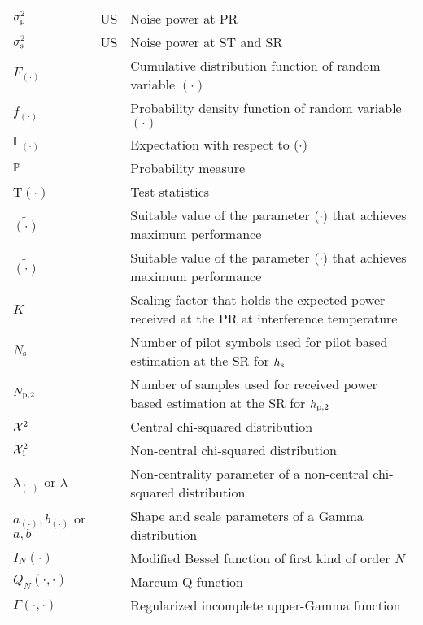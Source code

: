\begin{longtable}{p{}p{}p{}}
	$\sigma^2_{\text{p}}$	 		& US &  	Noise power at PR \\
	$\sigma^2_{\text{s}}$	 		& US &  	Noise power at ST and SR \\
       $F_{(\cdot)}$            & &          Cumulative distribution function of random variable $(\cdot)$ \\
       $f_{(\cdot)}$            & &          Probability density function of random variable $(\cdot)$ \\
       $\mathbb E_{(\cdot)}$    & &		Expectation with respect to ($\cdot$) \\
       $\mathbb P$                     & &     	Probability measure \\
       T$(\cdot)$  	        & &          Test statistics \\
       $\tilde{(\cdot)}$        & &		Suitable value of the parameter ($\cdot$) that achieves maximum performance \\
       $\tilde{(\cdot)}$        & &		Suitable value of the parameter ($\cdot$) that achieves maximum performance \\
       $K$                      & &      Scaling factor that holds the expected power received at the PR at interference temperature  \\
       $N_{\text{s}}$                    & &      Number of pilot symbols used for pilot based estimation at the SR for $h_{\text{s}}$ \\
       $N_{\text{p,2}}$                    & &      Number of samples used for received power based estimation at the SR for $h_{\text{p,2}}$ \\
       $\cchi2$                & &      Central chi-squared distribution \\
       $\ncchi2$                & &      Non-central chi-squared distribution \\
       $\lambda_{(\cdot)}$ or $\lambda$  &     &       Non-centrality parameter of a non-central chi-squared distribution \\
       $a_{(\cdot)}, b_{(\cdot)}$ or $a, b$ &  &       Shape and scale parameters of a Gamma distribution \\

       $I_{N}(\cdot)$	        & &	Modified Bessel function of first kind of order $N$ \\		
       $Q_{N}(\cdot, \cdot)$	& &	Marcum Q-function \\		
       $\Gamma(\cdot, \cdot)$	& &	Regularized incomplete upper-Gamma function\\		
\end{longtable}
  



